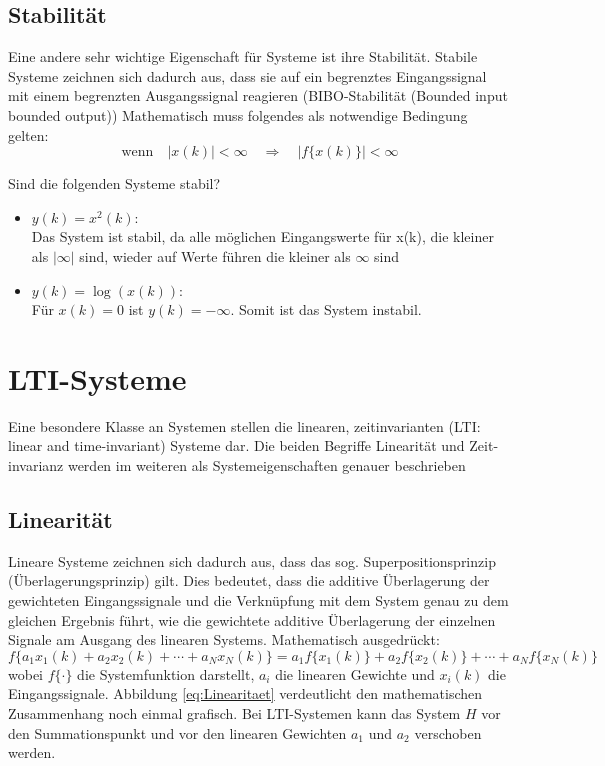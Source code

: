 \subsection{Stabilität}
Eine andere sehr wichtige Eigenschaft für Systeme ist ihre
Stabilität. Stabile Systeme zeichnen sich dadurch aus, dass sie
auf ein begrenztes Eingangssignal mit einem begrenzten
Ausgangssignal reagieren (BIBO-Stabilität (Bounded input bounded
output)) Mathematisch muss folgendes als notwendige Bedingung gelten:
\begin{equation}
\mbox{wenn} \quad |x(k)| < \infty \quad \Rightarrow \quad |f\{x(k)\}| <
\infty
\end{equation}
\begin{example}
Sind die folgenden Systeme stabil?
\begin{itemize}
    \item $y(k) = x^2(k)$:\\
    Das System ist stabil, da alle möglichen Eingangswerte für
    x(k), die kleiner als $|\infty|$ sind, wieder auf Werte führen
    die kleiner als $\infty$ sind
    \item $y(k) = \log(x(k))$:\\
    Für $x(k) = 0$ ist $y(k) = -\infty$. Somit ist das System
    instabil.
\end{itemize}
\end{example}

\section{LTI-Systeme}
Eine besondere Klasse an Systemen stellen die linearen,
zeitinvarianten (LTI: linear and time-invariant) Systeme dar. Die
beiden Begriffe Linearität und Zeit-invarianz werden im weiteren
als Systemeigenschaften genauer beschrieben

\subsection{Linearität}
Lineare Systeme zeichnen sich dadurch aus, dass das sog.
Superpositionsprinzip (Überlagerungsprinzip) gilt. Dies bedeutet,
dass die additive Überlagerung der gewichteten Eingangssignale und
die Verknüpfung mit dem System genau zu dem gleichen Ergebnis
führt, wie die gewichtete additive Überlagerung der einzelnen
Signale am Ausgang des linearen Systems. Mathematisch ausgedrückt:
\begin{equation} \label{eq:Linearitaet}
    f\{a_1 x_1(k) + a_2 x_2(k) + \cdots + a_N x_N(k)\} = a_1 f\{x_1(k)\} + a_2 f\{x_2(k)\} + \cdots + a_N f\{x_N(k)\}
\end{equation}
wobei $f\{\cdot\}$ die Systemfunktion darstellt, $a_i$ die
linearen Gewichte und $x_i(k)$ die Eingangssignale. Abbildung
\ref{eq:Linearitaet} verdeutlicht den mathematischen Zusammenhang noch einmal
grafisch. Bei LTI-Systemen kann das System $H$ vor den Summationspunkt und vor
den linearen Gewichten $a_1$ und $a_2$ verschoben werden.

